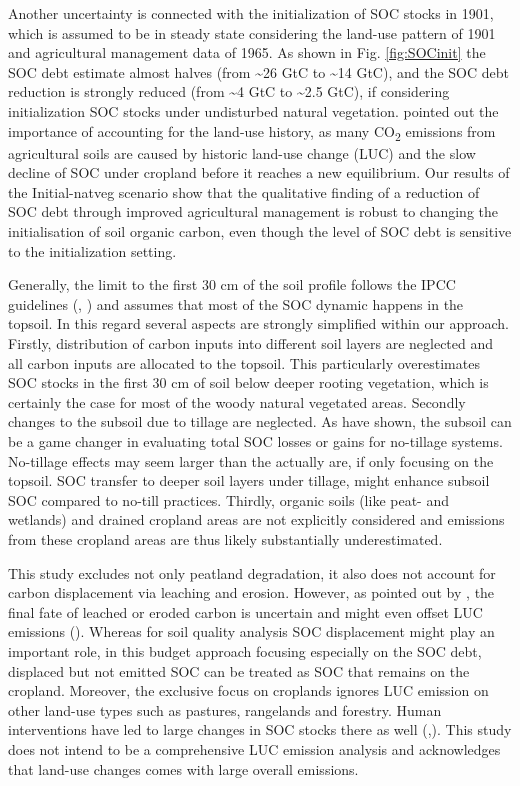 \documentclass[gc, manuscript]{copernicus}
\begin{document}
Another uncertainty is connected with the initialization of SOC stocks in 1901, which is assumed to be in steady state considering the land-use pattern of 1901 and agricultural management data of 1965. As shown in Fig. \ref{fig:SOCinit} the SOC debt estimate almost halves (from \textasciitilde26 GtC to \textasciitilde14 GtC), and the SOC debt reduction is strongly reduced (from \textasciitilde4 GtC to \textasciitilde2.5 GtC), if considering initialization SOC stocks under undisturbed natural vegetation. \citep{pugh_simulated_2015} pointed out the importance of accounting for the land-use history, as many CO\textsubscript{2} emissions from agricultural soils are caused by historic land-use change (LUC) and the slow decline of SOC under cropland before it reaches a new equilibrium. Our results of the Initial-natveg scenario show that the qualitative finding of a reduction of SOC debt through improved agricultural management is robust to changing the initialisation of soil organic carbon, even though the level of SOC debt is sensitive to the initialization setting.

Generally, the limit to the first 30 cm of the soil profile follows the IPCC guidelines (\citep{eggleston_ipcc_2006}, \citep{calvo_buendia_ipcc_2019}) and assumes that most of the SOC dynamic happens in the topsoil. In this regard several aspects are strongly simplified within our approach. Firstly, distribution of carbon inputs into different soil layers are neglected and all carbon inputs are allocated to the topsoil. This particularly overestimates SOC stocks in the first 30 cm of soil below deeper rooting vegetation, which is certainly the case for most of the woody natural vegetated areas. Secondly changes to the subsoil due to tillage are neglected. As \citep{powlson_limited_2014} have shown, the subsoil can be a game changer in evaluating total SOC losses or gains for no-tillage systems. No-tillage effects may seem larger than the actually are, if only focusing on the topsoil. SOC transfer to deeper soil layers under tillage, might enhance subsoil SOC compared to no-till practices. Thirdly, organic soils (like peat- and wetlands) and drained cropland areas are not explicitly considered and emissions from these cropland areas are thus likely substantially underestimated.

This study excludes not only peatland degradation, it also does not account for carbon displacement via leaching and erosion. However, as pointed out by \citep{doetterl_erosion_2016}, the final fate of leached or eroded carbon is uncertain and might even offset LUC emissions (\citep{wang_human-induced_2017}). Whereas for soil quality analysis SOC displacement might play an important role, in this budget approach focusing especially on the SOC debt, displaced but not emitted SOC can be treated as SOC that remains on the cropland.
Moreover, the exclusive focus on croplands ignores LUC emission on other land-use types such as pastures, rangelands and forestry. Human interventions have led to large changes in SOC stocks there as well (\citep{sanderman_soil_2017},\citep{friedlingstein_global_2019}). This study does not intend to be a comprehensive LUC emission analysis and acknowledges that land-use changes comes with large overall emissions.
\end{document}
